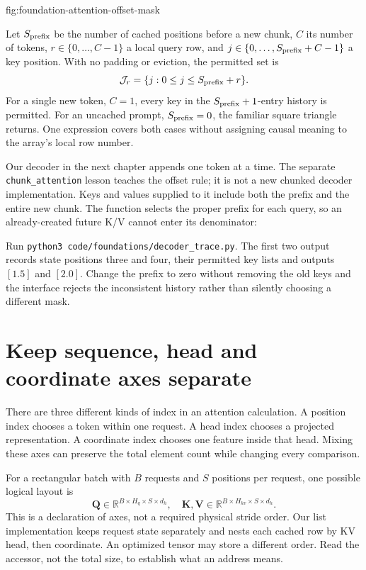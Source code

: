 {fig:foundation-attention-offset-mask}

Let $S_{\rm prefix}$ be the number of cached positions before a new chunk, $C$ its
number of tokens, $r\in\{0,\ldots,C-1\}$ a local query row, and
$j\in\{0,\ldots,S_{\rm prefix}+C-1\}$ a key position. With no padding or eviction,
the permitted set is
\[
 {\cal J}_r=\{j:0\le j\le S_{\rm prefix}+r\}.
\]
For a single new token, $C=1$, every key in the $S_{\rm prefix}+1$-entry history is
permitted. For an uncached prompt, $S_{\rm prefix}=0$, the familiar square triangle
returns. One expression covers both cases without assigning causal
meaning to the array's local row number.

Our decoder in the next chapter appends one token at a time. The separate
\texttt{chunk\_attention} lesson teaches the offset rule; it is not a new
chunked decoder implementation. Keys and values supplied to it include
both the prefix and the entire new chunk. The function selects the proper
prefix for each query, so an already-created future K/V cannot enter its
denominator:
\begin{minipage}{\linewidth}
\end{minipage}
Run \texttt{python3 code/foundations/decoder\_trace.py}. The first two
output records state positions three and four, their permitted key lists
and outputs $[1.5]$ and $[2.0]$. Change the prefix to zero without removing
the old keys and the interface rejects the inconsistent history rather
than silently choosing a different mask.

\section{Keep sequence, head and coordinate axes separate}
There are three different kinds of index in an attention calculation.
A position index chooses a token within one request. A head index chooses
a projected representation. A coordinate index chooses one feature
inside that head. Mixing these axes can preserve the total element count
while changing every comparison.

For a rectangular batch with $B$ requests and $S$ positions per request,
one possible logical layout is
\[
 \mathbf Q\in\mathbb R^{B\times H_q\times S\times d_h},\quad
 \mathbf K,\mathbf V\in
 \mathbb R^{B\times H_{kv}\times S\times d_h}.
\]
This is a declaration of axes, not a required physical stride order.
Our list implementation keeps request state separately and nests each
cached row by KV head, then coordinate. An optimized tensor may store a
different order. Read the accessor, not the total size, to establish what
an address means.

